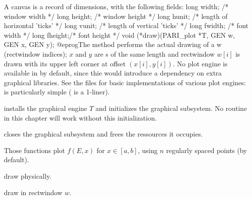 A  canvas is a record of dimensions, with the following fields:
\bprog
  long width;  /* window width */
  long height; /* window height */
  long hunit;  /* length of horizontal 'ticks' */
  long vunit;  /* length of vertical 'ticks' */
  long fwidth; /* font width */
  long fheight;/* font height */
  void (*draw)(PARI_plot *T, GEN w, GEN x, GEN y);
@eprog\noindent The  method performs the actual drawing of
a  w (rectwindow indices); $x$ and $y$ are s
of the same length and rectwindow $w[i]$ is drawn with its upper left
corner at offset $(x[i],y[i])$. No plot engine is available in 
by default, since thie would introduce a dependency on extra graphical
libraries. See the files  for basic implementations of
various plot engines:  is particularly simple ( is a
1-liner).

 installs the
graphical engine $T$ and initializes the graphical subsystem. No routine in
this chapter will work without this initialization.

 closes the graphical subsystem and
frees the ressources it occupies.

Those functions plot $f(E,x)$ for $x\in [a,b]$, using $n$ regularly spaced
points (by default).

 draw physically.

 draw in rectwindow $w$.











